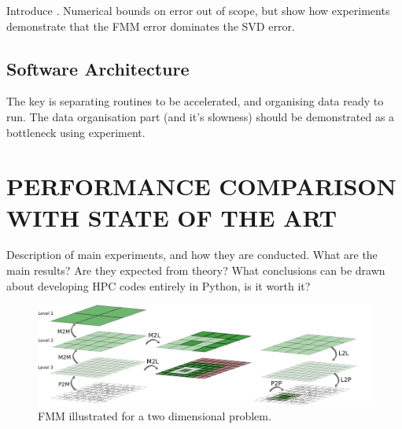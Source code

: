 \documentclass{IEEEcsmag}
\begin{document}
Introduce \cite{Ying2004}. Numerical bounds on error out of scope, but show how experiments demonstrate that the FMM error dominates the SVD error.

\subsection{Software Architecture}

The key is separating routines to be accelerated, and organising data ready to run. The data organisation part (and it's slowness) should be demonstrated as a bottleneck using experiment.

\section{PERFORMANCE COMPARISON WITH STATE OF THE ART}

Description of main experiments, and how they are conducted. What are the main results? Are they expected from theory? What conclusions can be drawn about developing HPC codes entirely in Python, is it worth it?




\begin{figure}
\centerline{\includegraphics {figures/algorithm.pdf}}
\caption{FMM illustrated for a two dimensional problem.}
\label{fig:tree_traversal}
\end{figure}
\end{document}
